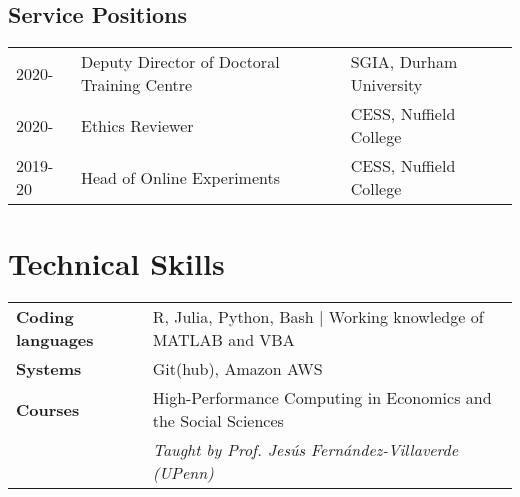 \documentclass[11pt, a4paper]{article}
\begin{document}
 \subsection*{Service Positions}

 \begin{tabular}{lll}
   2020- & Deputy Director of Doctoral Training Centre & SGIA, Durham University \\
   2020- & Ethics Reviewer & CESS, Nuffield College \\
   2019-20 & Head of Online Experiments & CESS, Nuffield College \\
   
 \end{tabular}



 \section*{Technical Skills}
 \begin{tabular}{ll}
    \textbf{Coding languages} & R, Julia, Python, Bash $|$ Working knowledge of MATLAB and VBA \\
    \textbf{Systems} & Git(hub), Amazon AWS \\
    \textbf{Courses} & High-Performance Computing in Economics and the Social Sciences \\
    & \textit{Taught by Prof. Jesús Fernández-Villaverde (UPenn)} \\
     
 \end{tabular}
\end{document}
